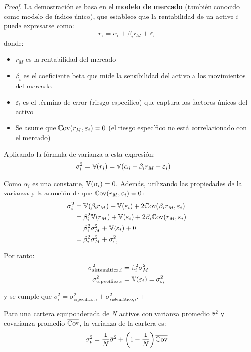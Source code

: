 \begin{proof}
La demostración se basa en el \textbf{modelo de mercado} (también conocido como modelo de índice único), que establece que la rentabilidad de un activo $i$ puede expresarse como:
$$r_i = \alpha_i + \beta_i r_M + \varepsilon_i$$
donde:
\begin{itemize}
\item $r_M$ es la rentabilidad del mercado
\item $\beta_i$ es el coeficiente beta que mide la sensibilidad del activo a los movimientos del mercado
\item $\varepsilon_i$ es el término de error (riesgo específico) que captura los factores únicos del activo
\item Se asume que $\mathbb{C}\text{ov}(r_M, \varepsilon_i) = 0$ (el riesgo específico no está correlacionado con el mercado)
\end{itemize}

Aplicando la fórmula de varianza a esta expresión:
\begin{align*}
\sigma_i^2 &= \mathbb{V}(r_i) = \mathbb{V}(\alpha_i + \beta_i r_M + \varepsilon_i)
\end{align*}

Como $\alpha_i$ es una constante, $\mathbb{V}(\alpha_i) = 0$. Además, utilizando las propiedades de la varianza y la asunción de que $\mathbb{C}\text{ov}(r_M, \varepsilon_i) = 0$:
\begin{align*}
\sigma_i^2 &= \mathbb{V}(\beta_i r_M) + \mathbb{V}(\varepsilon_i) + 2\mathbb{C}\text{ov}(\beta_i r_M, \varepsilon_i) \\
&= \beta_i^2 \mathbb{V}(r_M) + \mathbb{V}(\varepsilon_i) + 2\beta_i \mathbb{C}\text{ov}(r_M, \varepsilon_i) \\
&= \beta_i^2 \sigma_M^2 + \mathbb{V}(\varepsilon_i) + 0 \\
&= \beta_i^2 \sigma_M^2 + \sigma_{\varepsilon_i}^2
\end{align*}

Por tanto:
\begin{align*}
\sigma_{\text{sistemático},i}^2 &= \beta_i^2 \sigma_M^2 \\
\sigma_{\text{específico},i}^2 &= \mathbb{V}(\varepsilon_i) = \sigma_{\varepsilon_i}^2
\end{align*}

y se cumple que $\sigma_i^2 = \sigma_{\text{específico},i}^2 + \sigma_{\text{sistemático},i}^2$.
\end{proof}

\begin{proposicion}
Para una cartera equiponderada de $N$ activos con varianza promedio $\bar{\sigma}^2$ y covarianza promedio $\overline{\mathbb{C}\text{ov}}$, la varianza de la cartera es:
\begin{equation}
\sigma_p^2 = \frac{1}{N} \bar{\sigma}^2 + \left(1 - \frac{1}{N}\right) \overline{\mathbb{C}\text{ov}}
\end{equation}
\end{proposicion}

